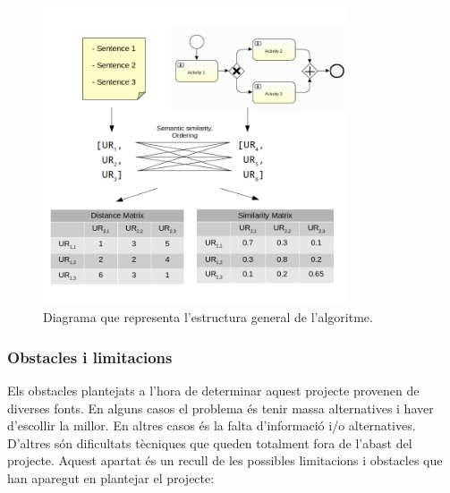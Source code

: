 \documentclass[10pt,a4paper]{article}
\begin{document}
\begin{figure}
    \centering
    \includegraphics[width=0.8\textwidth]{estructura_projecte.png}
    \caption{Diagrama que representa l'estructura general de l'algoritme.}
    \label{fig:estructura_projecte}
\end{figure}

\subsubsection{Obstacles i limitacions}
\label{obstacles}

Els obstacles plantejats a l'hora de determinar aquest projecte provenen de diverses fonts. En alguns casos el problema és tenir massa alternatives i haver d'escollir la millor. En altres casos és la falta d'informació i/o alternatives. D'altres són dificultats tècniques que queden totalment fora de l'abast del projecte. Aquest apartat és un recull de les possibles limitacions i obstacles que han aparegut en plantejar el projecte:
\end{document}
